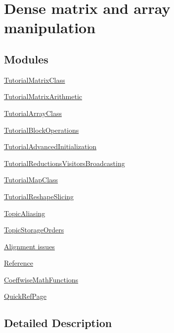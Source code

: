 \hypertarget{group___dense_matrix_manipulation__chapter}{}\section{Dense matrix and array manipulation}
\label{group___dense_matrix_manipulation__chapter}
\subsection*{Modules}
\begin{DoxyCompactItemize}
\item 
\hyperlink{group___tutorial_matrix_class}{Tutorial\+Matrix\+Class}
\item 
\hyperlink{group___tutorial_matrix_arithmetic}{Tutorial\+Matrix\+Arithmetic}
\item 
\hyperlink{group___tutorial_array_class}{Tutorial\+Array\+Class}
\item 
\hyperlink{group___tutorial_block_operations}{Tutorial\+Block\+Operations}
\item 
\hyperlink{group___tutorial_advanced_initialization}{Tutorial\+Advanced\+Initialization}
\item 
\hyperlink{group___tutorial_reductions_visitors_broadcasting}{Tutorial\+Reductions\+Visitors\+Broadcasting}
\item 
\hyperlink{group___tutorial_map_class}{Tutorial\+Map\+Class}
\item 
\hyperlink{group___tutorial_reshape_slicing}{Tutorial\+Reshape\+Slicing}
\item 
\hyperlink{group___topic_aliasing}{Topic\+Aliasing}
\item 
\hyperlink{group___topic_storage_orders}{Topic\+Storage\+Orders}
\item 
\hyperlink{group___dense_matrix_manipulation___alignement}{Alignment issues}
\item 
\hyperlink{group___dense_matrix_manipulation___reference}{Reference}
\item 
\hyperlink{group___coeffwise_math_functions}{Coeffwise\+Math\+Functions}
\item 
\hyperlink{group___quick_ref_page}{Quick\+Ref\+Page}
\end{DoxyCompactItemize}


\subsection{Detailed Description}
